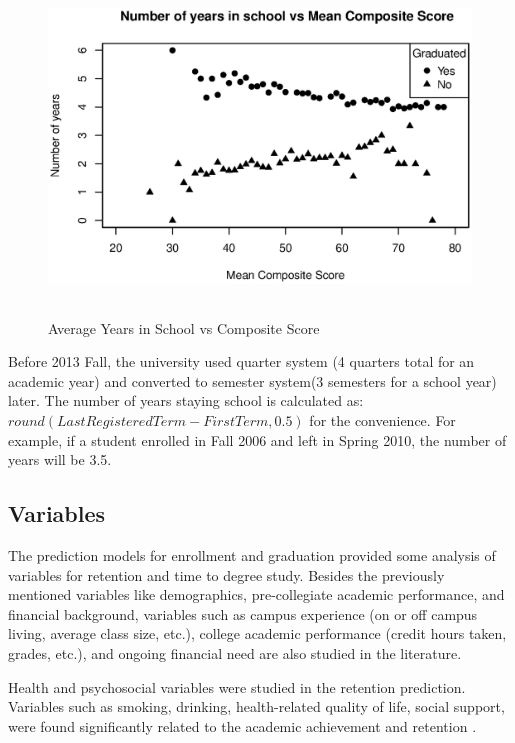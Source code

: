 \documentclass[12pt,english]{report}
\begin{document}
\begin{figure}[ht]
   \centering
\includegraphics[width=5in,
height=3.5in]{pic/years_in_school_vs_composite_score.eps}
 \caption{Average Years in School vs Composite Score}
 \label{years_composite}
\end{figure}


Before 2013 Fall, the university used quarter system (4 quarters total for an
academic year)
and converted to semester system(3 semesters for a school year) later. The
number of years 
staying school is calculated as:  $round(Last
Registered Term - First Term,0.5)$ for the convenience. For example, if a
student enrolled 
in Fall 2006 and left in Spring 2010, the number of years will be 3.5.



\subsection{Variables}
The prediction models for enrollment and graduation provided some analysis of
variables for
retention and time to degree study. Besides the previously mentioned variables
like demographics,
pre-collegiate academic performance, and financial background, variables such
as campus
experience (on or off campus living, average class size, etc.), college
academic
performance (credit hours taken, grades, etc.), and ongoing financial need are
also
studied in the literature.

Health and psychosocial variables were studied in the retention prediction.
Variables 
such as smoking, drinking, health-related quality of life, social support, were
found 
significantly related to the academic achievement and retention
\citep{deberard2004predictors,
maney1990predicting, musgrave1997personality, cutrona1994perceived}.
\end{document}
